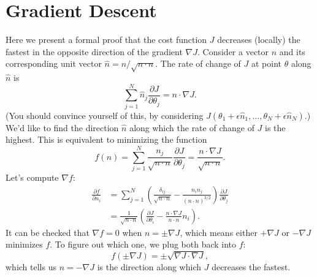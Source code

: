 \documentclass{article}
\theoremstyle{definition}
\begin{document}
\section{Gradient Descent}
\label{app-section:gd}
Here we present a formal proof that the cost function $J$ decreases (locally) the fastest in the opposite direction of the gradient $\nabla J$. Consider a vector $n$ and its corresponding unit vector $\hat{n}=n/\sqrt{n\cdot n}$. The rate of change of $J$ at point $\theta$ along $\hat{n}$ is
\begin{equation*}
    \sum_{j=1}^N\hat{n}_j\frac{\partial J}{\partial\theta_j} = n \cdot \nabla J.
\end{equation*}
(You should convince yourself of this, by considering $J(\theta_1+\epsilon \hat{n}_1, \dots, \theta_N+\epsilon \hat{n}_N)$.) We'd like to find the direction $\hat{n}$ along which the rate of change of $J$ is the highest. This is equivalent to minimizing the function
\begin{equation*}
    f(n) = \sum_{j=1}^N\frac{n_j}{\sqrt{n\cdot n}}\frac{\partial J}{\partial\theta_j} = \frac{n\cdot \nabla J}{\sqrt{n\cdot n}}.
\end{equation*}
Let's compute $\nabla f$:
\begin{align}
    \frac{\partial f}{\partial n_i} &= \sum_{j=1}^N\left(\frac{\delta_{ij}}{\sqrt{n\cdot n}}-\frac{n_in_j}{(n\cdot n)^{3/2}}\right)\frac{\partial J}{\partial\theta_j}\\
    &= \frac{1}{\sqrt{n\cdot n}}\left(\frac{\partial J}{\partial\theta_i}-\frac{n\cdot \nabla J}{n\cdot n}n_i\right).
\end{align}
It can be checked that $\nabla f = 0$ when $n=\pm \nabla J$, which means either $+\nabla J$ or $-\nabla J$ minimizes $f$. To figure out which one, we plug both back into $f$:
\begin{equation*}
    f(\pm \nabla J) = \pm \sqrt{\nabla J \cdot \nabla J},
\end{equation*}
which tells us $n=-\nabla J$ is the direction along which $J$ decreases the fastest.
\end{document}
